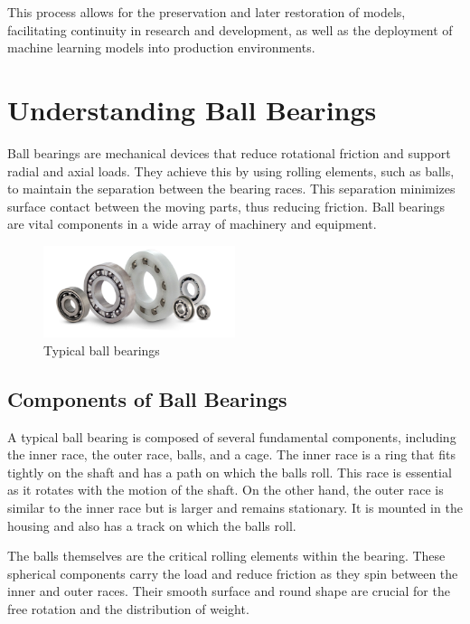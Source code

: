 This process allows for the preservation and later restoration of models, facilitating continuity in research and development, as well as the deployment of machine learning models into production environments.


\section{Understanding Ball Bearings}

Ball bearings are mechanical devices that reduce rotational friction and support radial and axial loads. They achieve this by using rolling elements, such as balls, to maintain the separation between the bearing races. This separation minimizes surface contact between the moving parts, thus reducing friction. Ball bearings are vital components in a wide array of machinery and equipment.

\begin{figure}[h]
    \centering
    \includegraphics[width=0.5\textwidth]{assets/ball-bearings.jpg}
    \caption{Typical ball bearings \cite{qbcballbearings}}
    \label{fig:ball_bearing}
\end{figure}

\subsection{Components of Ball Bearings}

A typical ball bearing is composed of several fundamental components, including the inner race, the outer race, balls, and a cage. The inner race is a ring that fits tightly on the shaft and has a path on which the balls roll. This race is essential as it rotates with the motion of the shaft. On the other hand, the outer race is similar to the inner race but is larger and remains stationary. It is mounted in the housing and also has a track on which the balls roll. 

The balls themselves are the critical rolling elements within the bearing. These spherical components carry the load and reduce friction as they spin between the inner and outer races. Their smooth surface and round shape are crucial for the free rotation and the distribution of weight.

